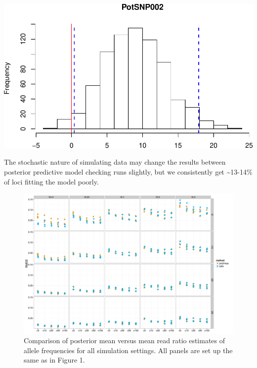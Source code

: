 \documentclass[]{article}
\newcommand{\beginsupplement}{%
        \setcounter{table}{0}
        \renewcommand{\thetable}{S\arabic{table}}%
        \setcounter{figure}{0}
        \renewcommand{\thefigure}{S\arabic{figure}}%
     }
\begin{document}
\includegraphics{supplement_files/figure-latex/unnamed-chunk-6-1.pdf}

The stochastic nature of simulating data may change the results between
posterior predictive model checking runs slightly, but we consistently
get \textasciitilde{}13-14\% of loci fitting the model poorly.

\beginsupplement

\begin{figure}[b]
\centering
\caption{Comparison of posterior mean versus mean read ratio estimates of allele frequencies for all simulation settings. All panels are set up the same as in Figure 1.}
\includegraphics[width=\textwidth]{pdf/figS1}
\end{figure}
\end{document}
